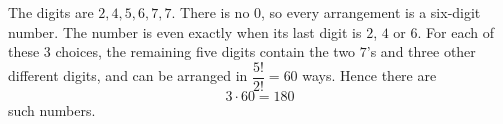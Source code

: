The digits are $2,4,5,6,7,7$. There is no $0$, so every arrangement is a six-digit number. The number is even exactly when its last digit is $2$, $4$ or $6$. For each of these $3$ choices, the remaining five digits contain the two $7$'s and three other different digits, and can be arranged in $\dfrac{5!}{2!}=60$ ways. Hence there are
\[3\cdot60=\boxed{180}\]
such numbers.
